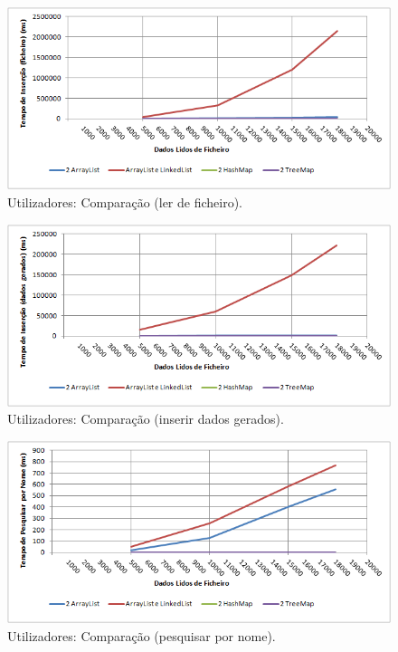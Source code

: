 \documentclass[a5paper,twocolumn, 11pt]{article}
\begin{document}
\clearpage
\onecolumn
\begin{figure}[h!b!t!]
    \caption[Utilizadores: Comparação (ler de ficheiro)]{Utilizadores: Comparação (ler de ficheiro).}
    \label{hashtable}
    \centering
        \includegraphics[width=400pt]{cusers_o1.png}
\end{figure}
\begin{figure}[h!b!t!]
    \caption[Utilizadores: Comparação (inserir dados gerados)]{Utilizadores: Comparação (inserir dados gerados).}
    \label{hashtable}
    \centering
        \includegraphics[width=400pt]{cusers_o2.png}
\end{figure}
\begin{figure}[h!b!t!]
    \caption[Utilizadores: Comparação (pesquisar por nome)]{Utilizadores: Comparação (pesquisar por nome).}
    \label{hashtable}
    \centering
        \includegraphics[width=400pt]{cusers_o3.png}
\end{figure}
\end{document}
